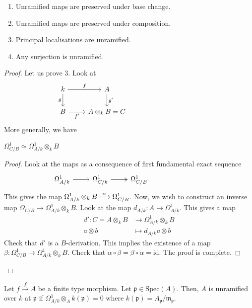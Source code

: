 \documentclass[oneside, 12pt]{scrbook}
\newcommand{\spec}{\mathrm{Spec}}
\newcommand{\pr}{\mathfrak{p}}
\newcommand{\m}{\mathfrak{m}}
\newcommand{\id}{\mathrm{id}}
\theoremstyle{theorem}
\begin{document}
\begin{proposition}
\begin{enumerate}
\item Unramified maps are preserved under base change.
\item Unramified maps are preserved under composition.
\item Principal localisations are unramified.
\item Any surjection is unramified.
\end{enumerate}
\end{proposition}

\begin{proof}
Let us prove $3$. Look at 
\[\begin{tikzcd}
	k & A &&&& {} \\
	B & {A\otimes_{k}B=C}
	\arrow["f", from=1-1, to=1-2]
	\arrow["g"', from=1-1, to=2-1]
	\arrow["{f'}"', from=2-1, to=2-2]
	\arrow["{g'}", from=1-2, to=2-2]
\end{tikzcd}\]
More generally, we have 
\begin{lemma}
$\Omega_{C/B}^1 \simeq \Omega_{A/k}^1 \otimes_{k}B$
\end{lemma}

\begin{proof}
Look at the maps as a consequence of first fundamental exact sequence
\[\begin{tikzcd}
	{\Omega_{A/k}^1} & {\Omega_{C/k}^1} & {\Omega_{C/B}^1} &&& {}
	\arrow[from=1-1, to=1-2]
	\arrow[two heads, from=1-2, to=1-3]
\end{tikzcd}\]
This gives the map $\Omega_{A/k}^1 \otimes_{k} B \xlongrightarrow{\alpha} \Omega_{C/B}^1$. Now, we wish to construct an inverse map $\Omega_{C/B} \rightarrow \Omega_{A/k}^1 \otimes_{k} B$. Look at the map $d_{A/k} : A \rightarrow \Omega_{A/k}^1$. This gives a map 
\begin{align*}
d' : C= A\otimes_{k} B &\rightarrow \Omega_{A/k}^1 \otimes_{k} B \\
a\otimes b &\mapsto d_{A/k} a \otimes b
\end{align*}
Check that $d'$ is a $B$-derivation. This implies the existence of a map $\beta : \Omega_{C/B}^1 \rightarrow \Omega_{A/k}^1 \otimes_{k} B$. Check that $\alpha \circ \beta = \beta \circ \alpha = \id$. The proof is complete.
\end{proof}
\end{proof}

\begin{lemma}
Let $f \xrightarrow{f} A$ be a finite type morphism. Let $\pr \in \spec(A)$. Then, $A$ is unramified over $k$ at $\pr$ if $\Omega_{A/k}^1 \otimes_{A} k(\pr) = 0$ where $k(\pr) = A_{\pr} / \m_{\pr}$.
\end{lemma}
\end{document}
